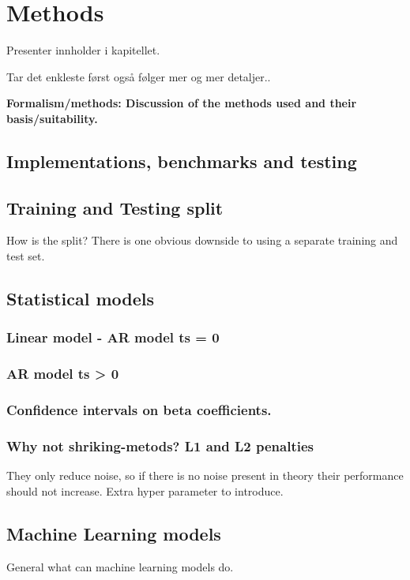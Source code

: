 \setcounter{chapter}{2}
\chapter{Methods}
Presenter innholder i kapitellet.

Tar det enkleste først også følger mer og mer detaljer..

\textbf{Formalism/methods: Discussion of the methods used and their basis/suitability.}\\ 

\section{Implementations, benchmarks and testing}

\section{Training and Testing split}
How is the split?
There is one obvious downside to using a separate training and test set.

\section{Statistical models}
\subsection{Linear model - AR model ts = 0} 
\subsection{AR model ts > 0}
\subsection{Confidence intervals on beta coefficients. }


\subsection{Why not shriking-metods? L1 and L2 penalties}
They only reduce noise, so if there is no noise present in theory their performance should not increase. Extra hyper parameter to introduce.


\section{Machine Learning models}
General what can machine learning models do.

